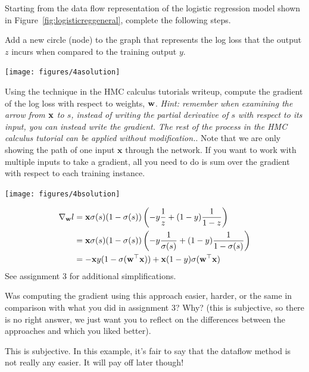 \documentclass[assignment06_Solutions]{subfiles}
\begin{document}
\begin{exercise}[(30 minutes)]
Starting from the data flow representation of the logistic regression model shown in Figure~\ref{fig:logisticreggeneral}, complete the following steps.
\bes
\item Add a new circle (node) to the graph that represents the log loss that the output $z$ incurs when compared to the training output $y$.
\begin{boxedsolution}
\begin{center}
\texttt{[image: figures/4asolution]}
\end{center}
\end{boxedsolution}
\item Using the technique in the HMC calculus tutorials writeup, compute the gradient of the log loss with respect to weights, $\mathbf{w}$.  \emph{Hint: remember when examining the arrow from $\mathbf{x}$ to $s$, instead of writing the partial derivative of $s$ with respect to its input, you can instead write the gradient.  The rest of the process in the HMC calculus tutorial can be applied without modification.}.   Note that we are only showing the path of one input $\mathbf{x}$ through the network.  If you want to work with multiple inputs to take a gradient, all you need to do is sum over the gradient with respect to each training instance.
\begin{boxedsolution}
\begin{center}
\texttt{[image: figures/4bsolution]}
\end{center}
\begin{align}
\nabla_{\mathbf{w}} l &= \mathbf{x} \sigma(s)(1-\sigma(s))\left(-y\frac{1}{z} + (1-y)\frac{1}{1-z}\right) \nonumber \\
&= \mathbf{x} \sigma(s)(1-\sigma(s))\left(-y\frac{1}{\sigma(s)} + (1-y)\frac{1}{1-\sigma(s)}\right) \nonumber \\
&= -\mathbf{x} y(1- \sigma(\mathbf{w}^\top \mathbf{x})) + \mathbf{x} (1-y) \sigma(\mathbf{w}^\top \mathbf{x})
\end{align}
See assignment 3 for additional simplifications.
\end{boxedsolution}
\item Was computing the gradient using this approach easier, harder, or the same in comparison with what you did in assignment 3?  Why? (this is subjective, so there is no right answer, we just want you to reflect on the differences between the approaches and which you liked better).
\begin{boxedsolution}
This is subjective.  In this example, it's fair to say that the dataflow method is not really any easier.  It will pay off later though!
\end{boxedsolution}
\ees
\end{exercise}
\end{document}
